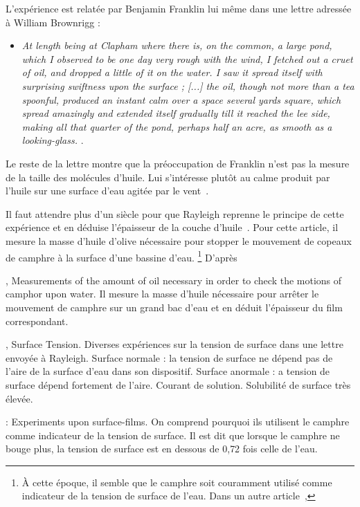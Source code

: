 \documentclass[12pt,a4paper]{article}
\begin{document}
L'expérience est relatée par Benjamin Franklin lui même dans une lettre adressée à William Brownrigg\cite{Franklin1773a} :
\begin{itemize}
\item[]
\textit{ \og
At length being at Clapham where there is, on the common, a large pond, which I observed to be one day very rough with the wind, I fetched out a cruet of oil, and dropped a little of it on the water.
I saw it spread itself with surprising swiftness upon the surface ;
[...] the oil, though not more than a tea spoonful, produced an instant calm over a space several yards square, which spread amazingly and extended itself gradually till it reached the lee side, making all that quarter of the pond, perhaps half an acre, as smooth as a looking-glass.
\fg{} }.
\end{itemize}
Le reste de la lettre montre que la préoccupation de Franklin n'est pas la mesure de la taille des molécules d'huile.
Lui s'intéresse plutôt au calme produit par l'huile sur une surface d'eau agitée par le vent~\cite{Mertens2006}.

Il faut attendre plus d'un siècle pour que Rayleigh reprenne le principe de cette expérience et en déduise l'épaisseur de la couche d'huile~\cite{Rayleigh1890a}.
Pour cette article, il mesure la masse d'huile d'olive nécessaire pour stopper le mouvement de copeaux de camphre à la surface d'une bassine d'eau.
\footnote{À cette époque, il semble que le camphre soit couramment utilisé comme indicateur de la tension de surface de l'eau.
Dans un autre article~\cite{Rayleigh1892}, } 
D'après 

\cite{Rayleigh1890a}, Measurements of the amount of oil necessary in order to check the motions of camphor upon water.
Il mesure la masse d'huile nécessaire pour arrêter le mouvement de camphre sur un grand bac d'eau et en déduit l'épaisseur du film correspondant.

\cite{Pockels1891}, Surface Tension.
Diverses expériences sur la tension de surface dans une lettre envoyée à Rayleigh.
Surface normale : la tension de surface ne dépend pas de l'aire de la surface d'eau dans son dispositif.
Surface anormale : a tension de surface dépend fortement de l'aire.
Courant de solution.
Solubilité de surface très élevée.

\cite{Rayleigh1892} : Experiments upon surface-films.
On comprend pourquoi ils utilisent le camphre comme indicateur de la tension de surface.
Il est dit que lorsque le camphre ne bouge plus, la tension de surface est en dessous de 0{,}72 fois celle de l'eau. 
\end{document}
